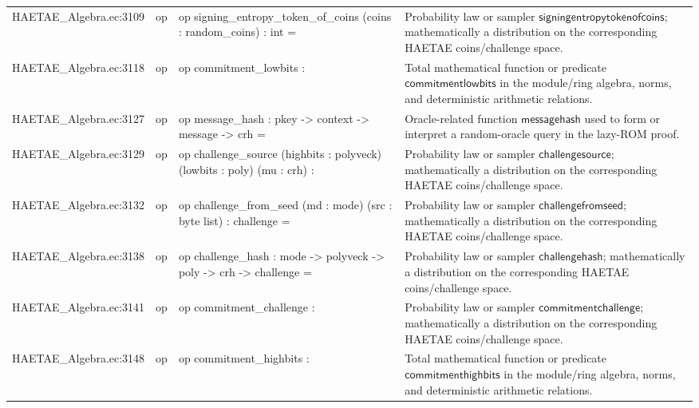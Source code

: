 \documentclass[10pt]{article}
\begin{document}
\begin{longtable}{L{0.11\textwidth}L{0.055\textwidth}L{0.385\textwidth}L{0.41\textwidth}}
HAETAE\_\allowbreak{}Algebra.\allowbreak{}ec:\allowbreak{}3109 & op & {\ttfamily\scriptsize op signing\_\allowbreak{}entropy\_\allowbreak{}token\_\allowbreak{}of\_\allowbreak{}coins (coins : random\_\allowbreak{}coins) : int =} & Probability law or sampler $\mathsf{signingentropytokenofcoins}$; mathematically a distribution on the corresponding HAETAE coins/challenge space. \\
HAETAE\_\allowbreak{}Algebra.\allowbreak{}ec:\allowbreak{}3118 & op & {\ttfamily\scriptsize op commitment\_\allowbreak{}lowbits :} & Total mathematical function or predicate $\mathsf{commitmentlowbits}$ in the module/ring algebra, norms, and deterministic arithmetic relations. \\
HAETAE\_\allowbreak{}Algebra.\allowbreak{}ec:\allowbreak{}3127 & op & {\ttfamily\scriptsize op message\_\allowbreak{}hash : pkey -\textgreater{} context -\textgreater{} message -\textgreater{} crh =} & Oracle-related function $\mathsf{messagehash}$ used to form or interpret a random-oracle query in the lazy-ROM proof. \\
HAETAE\_\allowbreak{}Algebra.\allowbreak{}ec:\allowbreak{}3129 & op & {\ttfamily\scriptsize op challenge\_\allowbreak{}source (highbits : polyveck) (lowbits : poly) (mu : crh) :} & Probability law or sampler $\mathsf{challengesource}$; mathematically a distribution on the corresponding HAETAE coins/challenge space. \\
HAETAE\_\allowbreak{}Algebra.\allowbreak{}ec:\allowbreak{}3132 & op & {\ttfamily\scriptsize op challenge\_\allowbreak{}from\_\allowbreak{}seed (md : mode) (src : byte list) : challenge =} & Probability law or sampler $\mathsf{challengefromseed}$; mathematically a distribution on the corresponding HAETAE coins/challenge space. \\
HAETAE\_\allowbreak{}Algebra.\allowbreak{}ec:\allowbreak{}3138 & op & {\ttfamily\scriptsize op challenge\_\allowbreak{}hash : mode -\textgreater{} polyveck -\textgreater{} poly -\textgreater{} crh -\textgreater{} challenge =} & Probability law or sampler $\mathsf{challengehash}$; mathematically a distribution on the corresponding HAETAE coins/challenge space. \\
HAETAE\_\allowbreak{}Algebra.\allowbreak{}ec:\allowbreak{}3141 & op & {\ttfamily\scriptsize op commitment\_\allowbreak{}challenge :} & Probability law or sampler $\mathsf{commitmentchallenge}$; mathematically a distribution on the corresponding HAETAE coins/challenge space. \\
HAETAE\_\allowbreak{}Algebra.\allowbreak{}ec:\allowbreak{}3148 & op & {\ttfamily\scriptsize op commitment\_\allowbreak{}highbits :} & Total mathematical function or predicate $\mathsf{commitmenthighbits}$ in the module/ring algebra, norms, and deterministic arithmetic relations. \\

\end{longtable}
\end{document}
